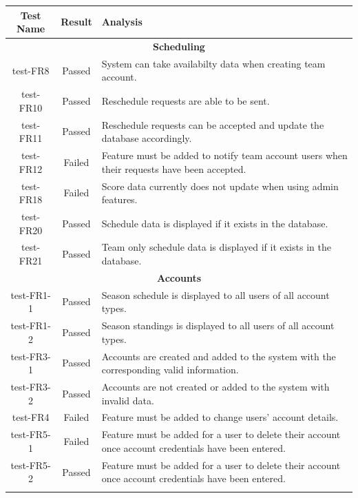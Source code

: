 \documentclass[12pt, titlepage]{article}
\begin{document}
\begin{longtable}{|c|c|p{8cm}|}
  \hline
  \textbf{Test Name} & \textbf{Result} & \textbf{Analysis}\\
  \hline
  \multicolumn{3}{|c|}{\textbf{Scheduling}}\\
  \hline
  test-FR8 & Passed & System can take availabilty data when creating team
  account.\\
  \hline
  test-FR10 & Passed & Reschedule requests are able to be sent.\\
  \hline
  test-FR11 & Passed & Reschedule requests can be accepted and update the
  database accordingly.\\
  \hline
  test-FR12 & Failed & Feature must be added to notify team account users
  when their requests have been accepted.\\
  \hline
  test-FR18 & Failed & Score data currently does not update when using admin
  features.\\
  \hline
  test-FR20 & Passed & Schedule data is displayed if it exists in the
  database.\\
  \hline
  test-FR21 & Passed & Team only schedule data is displayed if it exists in
  the database.\\
  \hline
  \multicolumn{3}{|c|}{\textbf{Accounts}} \\
  \hline
  test-FR1-1 & Passed & Season schedule is displayed to all users of all account types.\\
  \hline
  test-FR1-2 & Passed & Season standings is displayed to all users of all account types.\\
  \hline
  test-FR3-1 & Passed & Accounts are created and added to the system with the corresponding valid information.\\
  \hline
  test-FR3-2 & Passed & Accounts are not created or added to the system with invalid data.\\
  \hline
  test-FR4 & Failed & Feature must be added to change users' account details.\\
  \hline
  test-FR5-1 & Failed & Feature must be added for a user to delete their account once account credentials have been entered.\\
  \hline
  test-FR5-2 & Passed & Feature must be added for a user to delete their account once account credentials have been entered.\\\\

\end{longtable}
\end{document}
